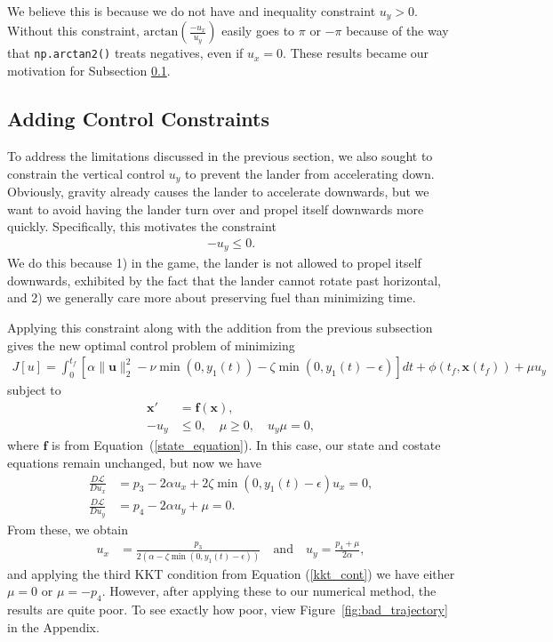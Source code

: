 \documentclass{article}
\begin{document}
We believe this is because we do not have and inequality constraint $u_y > 0$. Without this constraint, $\text{arctan}(\frac{-u_x}{u_y})$ easily goes to $\pi$ or $-\pi$ because of the way that \texttt{np.arctan2()} treats negatives, even if $u_x=0$. These results became our motivation for Subsection \ref{subsec:KKT}.

\subsection{Adding Control Constraints}
\label{subsec:KKT}
To address the limitations discussed in the previous section, we also sought to constrain the vertical control $u_y$ to prevent the lander from accelerating down.
Obviously, gravity already causes the lander to accelerate downwards, but we want to avoid having the lander turn over and propel itself downwards more quickly.
Specifically, this motivates the constraint
\begin{align*}
    -u_y \leq 0.
\end{align*}
We do this because
1) in the game, the lander is not allowed to propel itself downwards, exhibited by the fact that the lander cannot rotate past horizontal,
and 
2) we generally care more about preserving fuel than minimizing time.

Applying this constraint along with the addition from the previous subsection gives the new optimal control problem of minimizing
\begin{align}
    J[u] = \int_{0}^{t_f} \left[\alpha \|\mathbf{u}\|_2^2 - \nu\min(0, y_1(t)) - \zeta\min(0, y_1(t) - \epsilon)\right] dt + \phi(t_f, \mathbf{x}(t_f)) + \mu u_y
\end{align}
subject to
\begin{align}
    \mathbf{x}' &= \mathbf{f}(\mathbf{x}), \\
    -u_y &\leq 0, \quad \mu \geq 0, \quad u_y \mu = 0, \label{kkt_cont}
\end{align}
where $\mathbf{f}$ is from Equation~(\ref{state_equation}).
In this case, our state and costate equations remain unchanged, but now we have
\begin{align}
    \frac{D \mathscr L}{D u_x} &= p_3 - 2\alpha u_x + 2\zeta \min(0, y_1(t) - \epsilon)u_x = 0, \\
    \frac{D \mathscr L}{D u_y} &= p_4 - 2\alpha u_y + \mu = 0.
\end{align}
From these, we obtain
\begin{align}
    u_x &= \frac{p_3}{2\left(\alpha - \zeta \min(0, y_1(t)-\epsilon)\right) } \quad \text{and} \quad u_y = \frac{p_4 + \mu }{2\alpha },
\end{align}
and applying the third KKT condition from Equation (\ref{kkt_cont}) we have either $\mu = 0$ or $\mu = -p_4$.
However, after applying these to our numerical method, the results are quite poor.
To see exactly how poor, view Figure~\ref{fig:bad_trajectory} in the Appendix.
\end{document}
